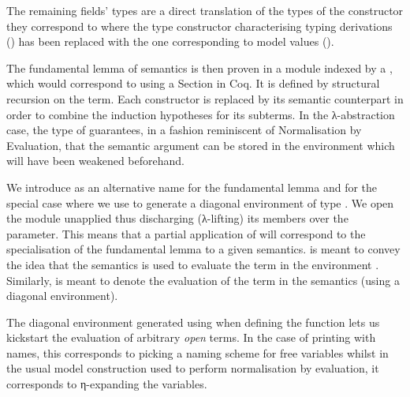 The remaining fields' types are a direct translation of the types
of the constructor they correspond to where the type constructor
characterising typing derivations () has been replaced
with the one corresponding to model values ().


The fundamental lemma of semantics is then proven in a module indexed by
a , which would correspond to using a Section in Coq. It is
defined by structural recursion on the term. Each constructor is replaced
by its semantic counterpart in order to combine the induction hypotheses
for its subterms. In the λ-abstraction case, the type of  guarantees,
in a fashion reminiscent of Normalisation by Evaluation, that the semantic
argument can be stored in the environment which will have been weakened
beforehand.



We introduce  as an alternative name for the fundamental
lemma and  for the special case where we use 
to generate a diagonal environment of type  \AF{[}  \AF{]}
. We open the module  unapplied thus discharging (λ-lifting)
its members over the  parameter. This means that a partial
application of  will correspond to the specialisation of the
fundamental lemma to a given semantics.     
is meant to convey the idea that the semantics  is used to evaluate
the term  in the environment . Similarly,  
 is meant to denote the evaluation of the term  in the semantics
 (using a diagonal environment).

\noindent\begin{minipage}[t]{0.55\textwidth}
\end{minipage}
\begin{minipage}[t]{0.45\textwidth}
\end{minipage}

The diagonal environment generated using  when defining the
 function lets us kickstart the evaluation of arbitrary
\emph{open} terms. In the case of printing with names, this corresponds to
picking a naming scheme for free variables whilst in the usual model
construction used to perform normalisation by evaluation, it corresponds
to η-expanding the variables.


